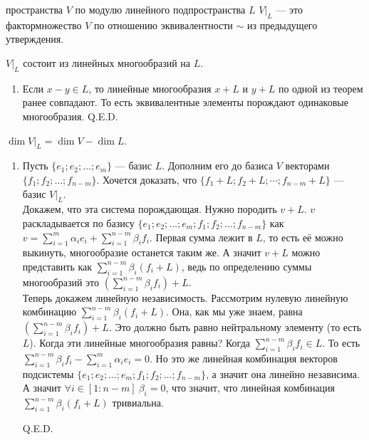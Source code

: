  пространства $V$ {по модулю} линейного {подпространства} $L$ $V\big|_L$ --- это фактормножество $V$ по отношению эквивалентности $\sim$ из предыдущего утверждения.

$V\big|_L$ состоит из линейных многообразий на $L$.
\begin{enumerate}
    \item[] \prooff{}
          Если $x-y\in L$, то линейные многообразия $x+L$ и $y+L$ по одной из теорем ранее совпадают. То есть эквивалентные элементы порождают одинаковые многообразия.
          \vskip 0.2in
          \hfill Q.E.D.
\end{enumerate}



$\dim V\big|_L=\dim V-\dim L$.
\begin{enumerate}
    \item[] \prooff{}
          Пусть $\{e_1;e_2;\ldots;e_m\}$ --- базис $L$. Дополним его до базиса $V$ векторами $\{f_1;f_2;\ldots;f_{n-m}\}$. Хочется доказать, что $\{f_1+L;f_2+L;\cdots;f_{n-m}+L\}$ --- базис $V\big|_L$.\\
          Докажем, что эта система порождающая. Нужно породить $v+L$. $v$ раскладывается по базису $\{e_1;e_2;\ldots;e_m;f_1;f_2;\ldots;f_{n-m}\}$ как $v=\sum\limits_{i=1}^m\alpha_ie_i+\sum\limits_{i=1}^{n-m}\beta_if_i$. Первая сумма лежит в $L$, то есть её можно выкинуть, многообразие останется таким же. А значит $v+L$ можно представить как $\sum\limits_{i=1}^{n-m}\beta_i(f_i+L)$, ведь по определению суммы многообразий это $\left(\sum\limits_{i=1}^{n-m}\beta_if_i\right)+L$.\\
          Теперь докажем линейную независимость. Рассмотрим нулевую линейную комбинацию $\sum\limits_{i=1}^{n-m}\beta_i(f_i+L)$. Она, как мы уже знаем, равна $\left(\sum\limits_{i=1}^{n-m}\beta_if_i\right)+L$. Это должно быть равно нейтральному элементу (то есть $L$). Когда эти линейные многообразия равны? Когда $\sum\limits_{i=1}^{n-m}\beta_if_i\in L$. То есть $\sum\limits_{i=1}^{n-m}\beta_if_i-\sum\limits_{i=1}^{m}\alpha_ie_i=0$. Но это же линейная комбинация векторов подсистемы $\{e_1;e_2;\ldots;e_m;f_1;f_2;\ldots;f_{n-m}\}$, а значит она линейно независима. А значит $\forall i\in[1:n-m]~\beta_i=0$, что значит, что линейная комбинация $\sum\limits_{i=1}^{n-m}\beta_i(f_i+L)$ тривиальна.
          
          \hfill Q.E.D.
\end{enumerate}



